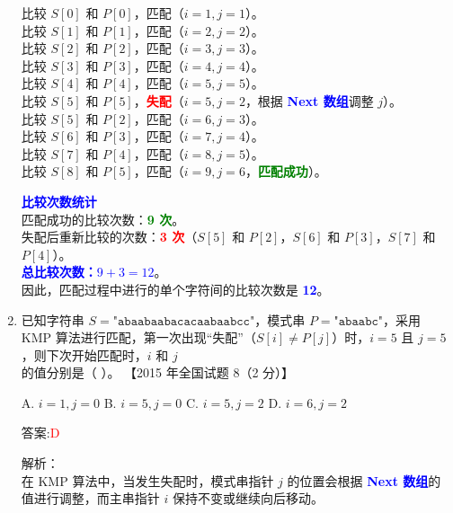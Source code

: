 \documentclass[lang=cn,newtx,10pt,scheme=chinese]{../../../elegantbook}
\begin{document}
\begin{enumerate}
                比较 $S[0]$ 和 $P[0]$，匹配（$i = 1, j = 1$）。\\
                比较 $S[1]$ 和 $P[1]$，匹配（$i = 2, j = 2$）。\\
                比较 $S[2]$ 和 $P[2]$，匹配（$i = 3, j = 3$）。\\
                比较 $S[3]$ 和 $P[3]$，匹配（$i = 4, j = 4$）。\\
                比较 $S[4]$ 和 $P[4]$，匹配（$i = 5, j = 5$）。\\
                比较 $S[5]$ 和 $P[5]$，\textbf{\textcolor{red}{失配}}（$i = 5, j = 2$，根据 \textbf{\textcolor{blue}{Next 数组}}调整 $j$）。\\
                比较 $S[5]$ 和 $P[2]$，匹配（$i = 6, j = 3$）。\\
                比较 $S[6]$ 和 $P[3]$，匹配（$i = 7, j = 4$）。\\
                比较 $S[7]$ 和 $P[4]$，匹配（$i = 8, j = 5$）。\\
                比较 $S[8]$ 和 $P[5]$，匹配（$i = 9, j = 6$，\textbf{\textcolor{green}{匹配成功}}）。
                
                \textbf{\textcolor{blue}{比较次数统计}}\\
                
                匹配成功的比较次数：\textbf{\textcolor{green}{9 次}}。\\
                失配后重新比较的次数：\textbf{\textcolor{red}{3 次}}（$S[5]$ 和 $P[2]$，$S[6]$ 和 $P[3]$，$S[7]$ 和 $P[4]$）。\\
                \textbf{\textcolor{blue}{总比较次数：$9 + 3 = 12$}}。\\
                因此，匹配过程中进行的单个字符间的比较次数是 \textbf{\textcolor{blue}{12}}。\\

    \item 已知字符串 $S = \texttt{"abaabaabacacaabaabcc"}$，模式串 $P = \texttt{"abaabc"}$，采用 KMP 算法进行匹配，第一次出现“失配”（$S[i] \neq P[j]$）时，$i=5$ 且 $j=5$，则下次开始匹配时，$i$ 和 $j$ 的值分别是（ ）。  
    【2015 年全国试题 8（2 分）】  

    A. $i=1, j=0$ \quad B. $i=5, j=0$ \quad C. $i=5, j=2$ \quad D. $i=6, j=2$  

    答案:\textcolor{red}{D}

    解析：\\
    在 KMP 算法中，当发生失配时，模式串指针 $j$ 的位置会根据 \textbf{\textcolor{blue}{Next 数组}}的值进行调整，而主串指针 $i$ 保持不变或继续向后移动。\\


\end{enumerate}
\end{document}
